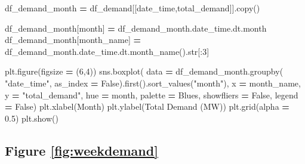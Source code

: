 \documentclass[mstat,12pt]{unswthesis}
\newenvironment{Shaded}{\begin{snugshade}}{\end{snugshade}}
\newcommand{\BuiltInTok}[1]{#1}
\newcommand{\DecValTok}[1]{\textcolor[rgb]{0.00,0.00,0.81}{#1}}
\newcommand{\FloatTok}[1]{\textcolor[rgb]{0.00,0.00,0.81}{#1}}
\newcommand{\NormalTok}[1]{#1}
\newcommand{\OperatorTok}[1]{\textcolor[rgb]{0.81,0.36,0.00}{\textbf{#1}}}
\newcommand{\StringTok}[1]{\textcolor[rgb]{0.31,0.60,0.02}{#1}}
\newcommand{\VariableTok}[1]{\textcolor[rgb]{0.00,0.00,0.00}{#1}}
\begin{document}
\begin{Shaded}
\begin{Highlighting}[]
\NormalTok{df\_demand\_month }\OperatorTok{=}\NormalTok{ df\_demand[[}\StringTok{\textquotesingle{}date\_time\textquotesingle{}}\NormalTok{,}\StringTok{\textquotesingle{}total\_demand\textquotesingle{}}\NormalTok{]].copy()}

\NormalTok{df\_demand\_month[}\StringTok{\textquotesingle{}month\textquotesingle{}}\NormalTok{] }\OperatorTok{=}\NormalTok{ df\_demand\_month.date\_time.dt.month}
\NormalTok{df\_demand\_month[}\StringTok{\textquotesingle{}month\_name\textquotesingle{}}\NormalTok{] }\OperatorTok{=} 
\NormalTok{    df\_demand\_month.date\_time.dt.month\_name().}\BuiltInTok{str}\NormalTok{[:}\DecValTok{3}\NormalTok{]}

\NormalTok{plt.figure(figsize }\OperatorTok{=}\NormalTok{ (}\DecValTok{6}\NormalTok{,}\DecValTok{4}\NormalTok{))}
\NormalTok{sns.boxplot(}
\NormalTok{    data }\OperatorTok{=}\NormalTok{ df\_demand\_month.groupby(}
      \StringTok{"date\_time"}\NormalTok{, as\_index }\OperatorTok{=} \VariableTok{False}\NormalTok{).first().sort\_values(}\StringTok{"month"}\NormalTok{), }
\NormalTok{      x }\OperatorTok{=} \StringTok{\textquotesingle{}month\_name\textquotesingle{}}\NormalTok{, y }\OperatorTok{=} \StringTok{"total\_demand"}\NormalTok{, hue }\OperatorTok{=} \StringTok{\textquotesingle{}month\textquotesingle{}}\NormalTok{, }
\NormalTok{      palette }\OperatorTok{=} \StringTok{\textquotesingle{}Blues\textquotesingle{}}\NormalTok{, showfliers }\OperatorTok{=} \VariableTok{False}\NormalTok{, legend }\OperatorTok{=} \VariableTok{False}\NormalTok{)}
\NormalTok{plt.xlabel(}\StringTok{\textquotesingle{}Month\textquotesingle{}}\NormalTok{)}
\NormalTok{plt.ylabel(}\StringTok{\textquotesingle{}Total Demand (MW)\textquotesingle{}}\NormalTok{)}
\NormalTok{plt.grid(alpha }\OperatorTok{=} \FloatTok{0.5}\NormalTok{)}
\NormalTok{plt.show()}
\end{Highlighting}
\end{Shaded}

\subsection*{Figure \ref{fig:weekdemand}}\label{figure-reffigweekdemand}
\end{document}
